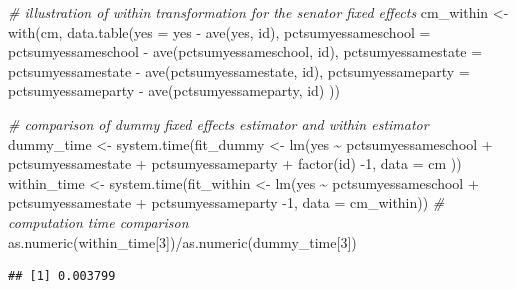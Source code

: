 \documentclass[
  12pt,
]{style/krantz}
\newenvironment{Shaded}{\begin{snugshade}}{\end{snugshade}}
\newcommand{\AttributeTok}[1]{\textcolor[rgb]{0.77,0.63,0.00}{#1}}
\newcommand{\CommentTok}[1]{\textcolor[rgb]{0.56,0.35,0.01}{\textit{#1}}}
\newcommand{\DecValTok}[1]{\textcolor[rgb]{0.00,0.00,0.81}{#1}}
\newcommand{\FunctionTok}[1]{\textcolor[rgb]{0.00,0.00,0.00}{#1}}
\newcommand{\NormalTok}[1]{#1}
\newcommand{\OtherTok}[1]{\textcolor[rgb]{0.56,0.35,0.01}{#1}}
\newcommand{\SpecialCharTok}[1]{\textcolor[rgb]{0.00,0.00,0.00}{#1}}
\begin{document}
\begin{Shaded}
\begin{Highlighting}[]
\CommentTok{\# illustration of within transformation for the senator fixed effects}
\NormalTok{cm\_within }\OtherTok{\textless{}{-}} 
  \FunctionTok{with}\NormalTok{(cm, }\FunctionTok{data.table}\NormalTok{(}\AttributeTok{yes =}\NormalTok{ yes }\SpecialCharTok{{-}} \FunctionTok{ave}\NormalTok{(yes, id),}
                      \AttributeTok{pctsumyessameschool =}\NormalTok{ pctsumyessameschool }\SpecialCharTok{{-}} \FunctionTok{ave}\NormalTok{(pctsumyessameschool, id),}
                      \AttributeTok{pctsumyessamestate =}\NormalTok{ pctsumyessamestate }\SpecialCharTok{{-}} \FunctionTok{ave}\NormalTok{(pctsumyessamestate, id),}
                      \AttributeTok{pctsumyessameparty =}\NormalTok{ pctsumyessameparty }\SpecialCharTok{{-}} \FunctionTok{ave}\NormalTok{(pctsumyessameparty, id)}
\NormalTok{                      ))}

\CommentTok{\# comparison of dummy fixed effects estimator and within estimator}
\NormalTok{dummy\_time }\OtherTok{\textless{}{-}} \FunctionTok{system.time}\NormalTok{(fit\_dummy }\OtherTok{\textless{}{-}} 
              \FunctionTok{lm}\NormalTok{(yes }\SpecialCharTok{\textasciitilde{}}\NormalTok{ pctsumyessameschool }\SpecialCharTok{+} 
\NormalTok{                           pctsumyessamestate }\SpecialCharTok{+}\NormalTok{ pctsumyessameparty }\SpecialCharTok{+} \FunctionTok{factor}\NormalTok{(id) }\SpecialCharTok{{-}}\DecValTok{1}\NormalTok{, }\AttributeTok{data =}\NormalTok{ cm}
\NormalTok{                         ))}
\NormalTok{within\_time }\OtherTok{\textless{}{-}} \FunctionTok{system.time}\NormalTok{(fit\_within }\OtherTok{\textless{}{-}} 
                             \FunctionTok{lm}\NormalTok{(yes }\SpecialCharTok{\textasciitilde{}}\NormalTok{ pctsumyessameschool }\SpecialCharTok{+} 
\NormalTok{                           pctsumyessamestate }\SpecialCharTok{+}\NormalTok{ pctsumyessameparty }\SpecialCharTok{{-}}\DecValTok{1}\NormalTok{, }\AttributeTok{data =}\NormalTok{ cm\_within))}
\CommentTok{\# computation time comparison}
\FunctionTok{as.numeric}\NormalTok{(within\_time[}\DecValTok{3}\NormalTok{])}\SpecialCharTok{/}\FunctionTok{as.numeric}\NormalTok{(dummy\_time[}\DecValTok{3}\NormalTok{])}
\end{Highlighting}
\end{Shaded}

\begin{verbatim}
## [1] 0.003799
\end{verbatim}
\end{document}
